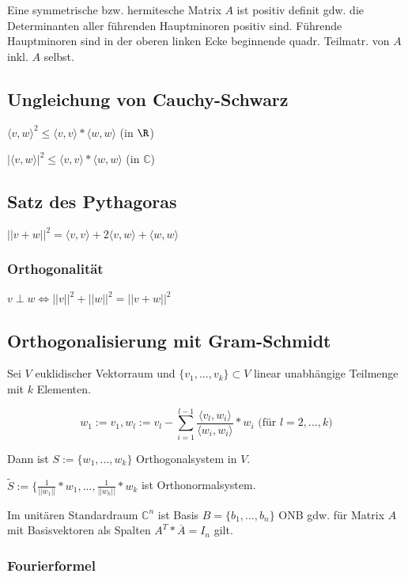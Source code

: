 Eine symmetrische bzw. hermitesche Matrix $A$ ist positiv definit gdw. die Determinanten aller führenden Hauptminoren positiv sind. Führende Hauptminoren sind in der oberen linken Ecke beginnende quadr. Teilmatr. von $A$ inkl. $A$ selbst.

\subsection*{Ungleichung von Cauchy-Schwarz}

$\langle v, w \rangle ^2 \leq \langle v, v \rangle * \langle w, w \rangle$ (in $\R$)

$|\langle v, w \rangle |^2 \leq \langle v, v \rangle * \langle w, w \rangle$ (in $\mathbb{C}$)

\subsection*{Satz des Pythagoras}

$||v+w||^2 = \langle v, v \rangle + 2\langle v, w \rangle + \langle w, w \rangle$

\subsubsection*{Orthogonalität}

$v \perp w \Leftrightarrow ||v||^2 + ||w||^2 = ||v+w||^2$

\subsection*{Orthogonalisierung mit Gram-Schmidt}

Sei $V$ euklidischer Vektorraum und $\{v_1, ..., v_k\} \subset V$ linear unabhängige Teilmenge mit $k$ Elementen.

\vspace*{-4mm}
\[ w_1 := v_1, w_l := v_l - \sum_{i=1}^{l-1} \frac{\langle v_l, w_i \rangle}{\langle w_i, w_i\rangle}*w_i \text{ (für } l = 2, ..., k) \]

Dann ist $S := \{w_1, ..., w_k\}$ Orthogonalsystem in $V$.

$\tilde S := \{\frac{1}{||w_1||}*w_1, ..., \frac{1}{||w_k||}*w_k$ ist Orthonormalsystem.

Im unitären Standardraum $\mathbb{C}^n$ ist Basis $B = \{b_1, ..., b_n\}$ ONB gdw. für Matrix $A$ mit Basisvektoren als Spalten $A^T*\overline A = I_n$ gilt.

\subsubsection*{Fourierformel}

